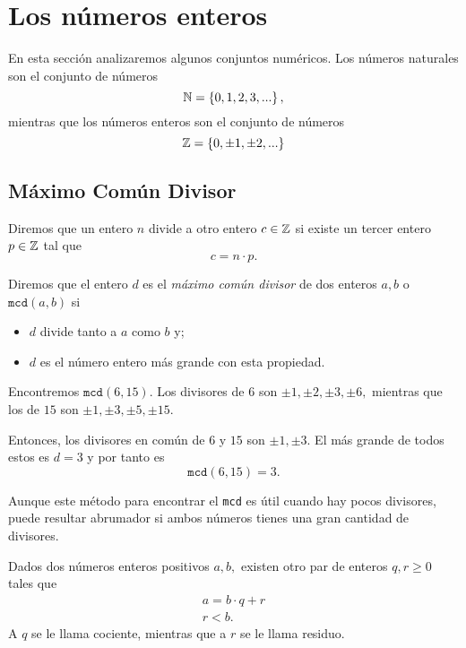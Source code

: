 \section{Los números enteros}
	
	En esta sección analizaremos algunos conjuntos numéricos. 
	Los números naturales son el conjunto de números
	$$
	\mathbb{N}=\left\{ 0,1,2,3,... \right\},
	$$	
	mientras que los números enteros son el conjunto de números
	$$
	\mathbb{Z}=\left\{ 0, \pm1, \pm2,... \right\}	$$	


\subsection{Máximo Común Divisor}
	
\begin{definicion}
	Diremos que un entero $n$ divide a otro entero $c\in \mathbb{Z}$ si existe un tercer entero $p\in \mathbb{Z}$ tal que 
	$$c=n\cdot p.$$
\end{definicion}

\begin{definicion}
	\label{mcd} 
	Diremos que el entero $d$ es el \emph{máximo común divisor} de dos enteros $a,b$ o $\texttt{mcd}(a,b)$  si
	\begin{itemize}
		\item $d$ divide tanto a $a$ como $b$ y;
		\item $d$ es el número entero más grande con esta propiedad.
	\end{itemize}
\end{definicion}

	\begin{problema}
		\label{exmp:mcd}
		Encontremos $\texttt{mcd}(6,15).$ Los divisores de $6$ son $\pm1, \pm2, \pm3, \pm6,$ mientras que los de $15$ son $\pm1, \pm3, \pm5, \pm15.$
		
		Entonces, los divisores en común de $6$ y $15$ son $\pm1,\pm3.$ El más grande de todos estos es 
		$d=3$ y por tanto es $$ \texttt{mcd}(6,15)=3. $$
	\end{problema}
	
 	Aunque este m\'etodo para encontrar el \texttt{mcd} es útil cuando hay pocos divisores, puede resultar abrumador si  	ambos números tienes una gran cantidad de divisores. 
   
	\begin{proposicion}
		Dados dos números enteros positivos $a,b,$ existen otro par de enteros $q, r\geq 0$ tales que
		\begin{align}
			\label{cociente}
			a=b\cdot q+r\\
			\label{residuo}
			r<b.
		\end{align}
		A $q$ se le llama cociente, mientras que a $r$ se le llama residuo.
	\end{proposicion}




